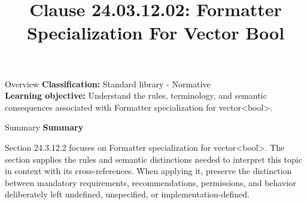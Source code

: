 \documentclass[10pt,letterpaper]{article}
\title{Clause 24.03.12.02: Formatter Specialization For Vector Bool}
\author{}
\date{}
\begin{document}
\maketitle
\begin{CornellOverviewBox}{Overview}
\textbf{Classification:} Standard library - Normative\\[2pt]
\textbf{Learning objective:} Understand the rules, terminology, and semantic consequences associated with Formatter specialization for vector<bool>.
\end{CornellOverviewBox}\begin{CornellSummaryBox}{Summary}
{\sffamily\bfseries\color{Accent} Summary}\par\vspace{3pt}Section 24.3.12.2 focuses on Formatter specialization for vector<bool>. The section supplies the rules and semantic distinctions needed to interpret this topic in context with its cross-references. When applying it, preserve the distinction between mandatory requirements, recommendations, permissions, and behavior deliberately left undefined, unspecified, or implementation-defined.
\end{CornellSummaryBox}
\end{document}
